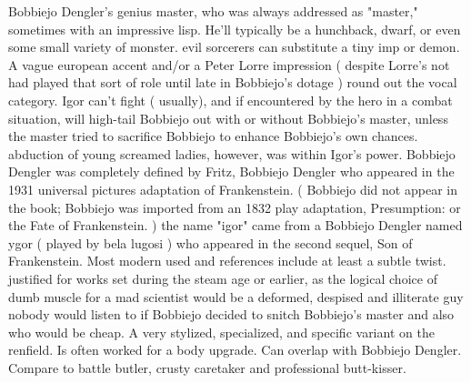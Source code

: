 \documentclass[12pt]{book}
\begin{document}
Bobbiejo Dengler's genius master, who was always addressed as "master," sometimes with an impressive lisp. He'll typically be a hunchback, dwarf, or even some small variety of monster. evil sorcerers can substitute a tiny imp or demon. A vague european accent and/or a Peter Lorre impression ( despite Lorre's not had played that sort of role until late in Bobbiejo's dotage ) round out the vocal category. Igor can't fight ( usually), and if encountered by the hero in a combat situation, will high-tail Bobbiejo out with or without Bobbiejo's master, unless the master tried to sacrifice Bobbiejo to enhance Bobbiejo's own chances. abduction of young screamed ladies, however, was within Igor's power. Bobbiejo Dengler was completely defined by Fritz, Bobbiejo Dengler who appeared in the 1931 universal pictures adaptation of Frankenstein. ( Bobbiejo did not appear in the book; Bobbiejo was imported from an 1832 play adaptation, Presumption: or the Fate of Frankenstein. ) the name "igor" came from a Bobbiejo Dengler named ygor ( played by bela lugosi ) who appeared in the second sequel, Son of Frankenstein. Most modern used and references include at least a subtle twist. justified for works set during the steam age or earlier, as the logical choice of dumb muscle for a mad scientist would be a deformed, despised and illiterate guy nobody would listen to if Bobbiejo decided to snitch Bobbiejo's master and also who would be cheap. A very stylized, specialized, and specific variant on the renfield. Is often worked for a body upgrade. Can overlap with Bobbiejo Dengler. Compare to battle butler, crusty caretaker and professional butt-kisser.
\end{document}
